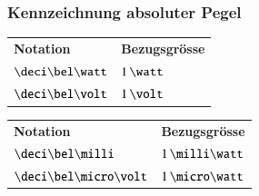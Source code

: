 \subsubsection{Kennzeichnung absoluter Pegel}

\begin{center}
    \begin{tabular}{ll}
        \textbf{Notation}       & \textbf{Bezugsgrösse} \\
        $\deci\bel\watt$        & $1 \, \watt$          \\
        $\deci\bel\volt$        & $1 \, \volt$          \\
    \end{tabular}\hspace{5mm}
    \begin{tabular}{ll}
        \textbf{Notation}       & \textbf{Bezugsgrösse} \\
        $\deci\bel\milli$       & $1 \, \milli \watt$ \\
        $\deci\bel\micro\volt$  & $1 \, \micro \watt$ 
    \end{tabular}
\end{center}


